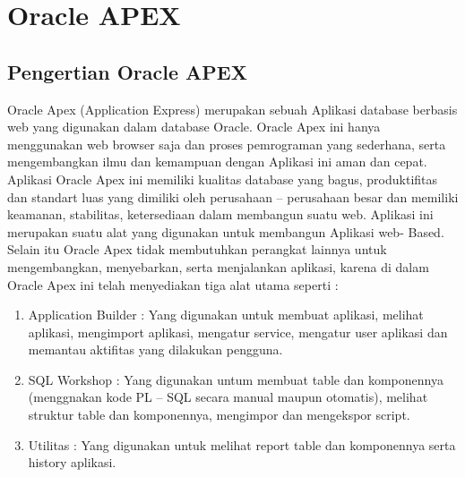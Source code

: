 \chapter{Oracle APEX}

\section{Pengertian Oracle APEX}
Oracle Apex (Application Express) merupakan sebuah Aplikasi database berbasis web yang digunakan dalam database Oracle. Oracle Apex ini hanya menggunakan web browser saja dan proses pemrograman yang sederhana, serta mengembangkan ilmu dan kemampuan dengan Aplikasi ini aman dan cepat. Aplikasi Oracle Apex ini memiliki kualitas database yang bagus, produktifitas dan standart luas yang dimiliki oleh perusahaan – perusahaan besar dan memiliki keamanan, stabilitas, ketersediaan dalam membangun suatu web. Aplikasi ini merupakan suatu alat yang digunakan untuk membangun Aplikasi web- Based. Selain itu Oracle Apex tidak membutuhkan perangkat lainnya untuk mengembangkan, menyebarkan, serta menjalankan aplikasi, karena di dalam Oracle Apex ini telah menyediakan tiga alat utama seperti : 
\begin{enumerate}
    \item Application Builder : Yang digunakan untuk membuat aplikasi, melihat aplikasi, mengimport aplikasi, mengatur service, mengatur user aplikasi dan memantau aktifitas yang dilakukan pengguna.
    \item SQL Workshop : Yang digunakan untum membuat table dan komponennya (menggnakan kode PL – SQL secara manual maupun otomatis), melihat struktur table dan komponennya, mengimpor dan mengekspor script.
    \item Utilitas : Yang digunakan untuk melihat report table dan komponennya serta history aplikasi.
\end{enumerate}


